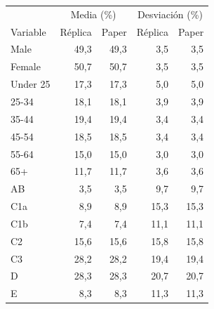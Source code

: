 \begin{tabular}{lrrrr}\toprule
 & \multicolumn{2}{c}{Media (\%)} & \multicolumn{2}{c}{Desviación (\%)} \\
Variable & Réplica & Paper & Réplica & Paper \\\midrule
Male & 49,3 & 49,3 & 3,5 & 3,5 \\
Female & 50,7 & 50,7 & 3,5 & 3,5 \\
Under 25 & 17,3 & 17,3 & 5,0 & 5,0 \\
25-34 & 18,1 & 18,1 & 3,9 & 3,9 \\
35-44 & 19,4 & 19,4 & 3,4 & 3,4 \\
45-54 & 18,5 & 18,5 & 3,4 & 3,4 \\
55-64 & 15,0 & 15,0 & 3,0 & 3,0 \\
65+ & 11,7 & 11,7 & 3,6 & 3,6 \\
AB & 3,5 & 3,5 & 9,7 & 9,7 \\
C1a & 8,9 & 8,9 & 15,3 & 15,3 \\
C1b & 7,4 & 7,4 & 11,1 & 11,1 \\
C2 & 15,6 & 15,6 & 15,8 & 15,8 \\
C3 & 28,2 & 28,2 & 19,4 & 19,4 \\
D & 28,3 & 28,3 & 20,7 & 20,7 \\
E & 8,3 & 8,3 & 11,3 & 11,3 \\
\bottomrule\end{tabular}
